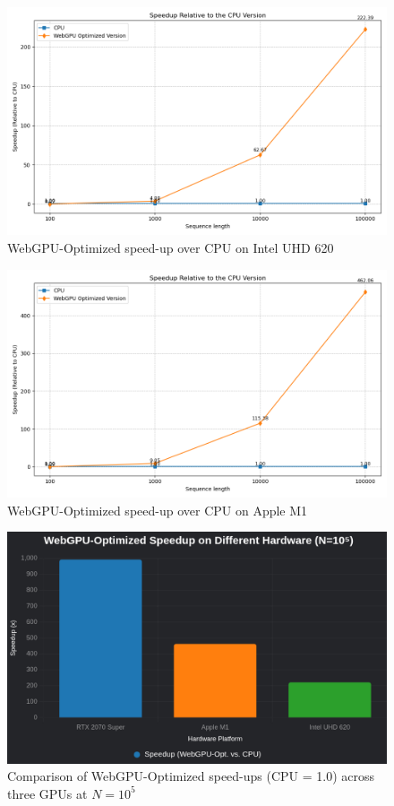 \documentclass[PhD]{PHlab-thesis}
\begin{document}
\begin{figure}[h]
    \centering
    \includegraphics[width=0.7\linewidth]{uhd620.png}
    \caption{WebGPU-Optimized speed-up over CPU on Intel UHD 620}
    \label{fig:uhd620}
\end{figure}

\begin{figure}[h]
    \centering
    \includegraphics[width=0.7\linewidth]{m1.png}
    \caption{WebGPU-Optimized speed-up over CPU on Apple M1}
    \label{fig:m1}
\end{figure}

\begin{figure}[h]
    \centering
    \includegraphics[width=0.7\linewidth]{比較不同硬體（RTX 2070 Super、M1、UHD 620）在 N=10⁵ 時的 WebGPU-Optimized 加速比.png}
    \caption{Comparison of WebGPU-Optimized speed-ups (CPU = 1.0) across three GPUs at $N=10^5$}
    \label{fig:cross-hw}
\end{figure}
\end{document}

